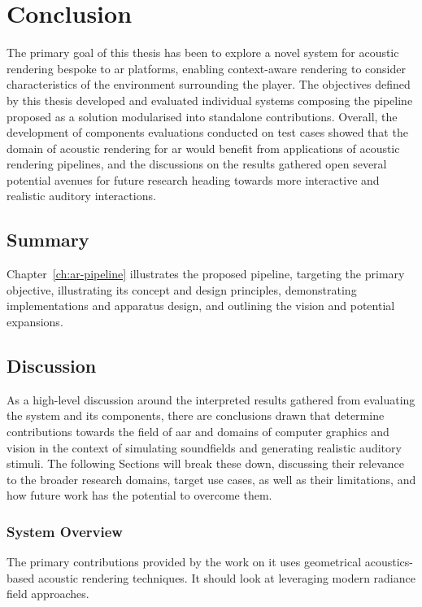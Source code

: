 \chapter{Conclusion}\label{ch:Conclusion}

The primary goal of this thesis has been to explore a novel system for acoustic rendering bespoke to \acrshort{ar} platforms, enabling context-aware rendering to consider characteristics of the environment surrounding the player. The objectives defined by this thesis developed and evaluated individual systems composing the pipeline proposed as a solution modularised into standalone contributions. Overall, the development of components evaluations conducted on test cases showed that the domain of acoustic rendering for \acrshort{ar} would benefit from applications of acoustic rendering pipelines, and the discussions on the results gathered open several potential avenues for future research heading towards more interactive and realistic auditory interactions.

\section{Summary}
Chapter~\ref{ch:ar-pipeline} illustrates the proposed pipeline, targeting the primary objective, illustrating its concept and design principles, demonstrating implementations and apparatus design, and outlining the vision and potential expansions. 

\section{Discussion}
As a high-level discussion around the interpreted results gathered from evaluating the system and its components, there are conclusions drawn that determine contributions towards the field of \acrfull{aar} and domains of computer graphics and vision in the context of simulating soundfields and generating realistic auditory stimuli. The following Sections will break these down, discussing their relevance to the broader research domains, target use cases, as well as their limitations, and how future work has the potential to overcome them.

\subsection{System Overview}
The primary contributions provided by the work on 
it uses geometrical acoustics-based acoustic rendering techniques. It should look at leveraging modern radiance field approaches.

